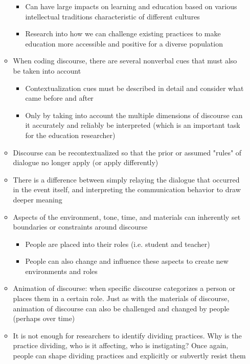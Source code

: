 \documentclass{TC}
\begin{document}
\begin{itemize}
\begin{itemize}
\begin{itemize}
	\item Can have large impacts on learning and education based on various intellectual traditions characteristic of different cultures
	\item Research into how we can challenge existing practices to make education more accessible and positive for a diverse population
	\end{itemize}
\item When coding discourse, there are several nonverbal cues that must also be taken into account
	\begin{itemize}
	\item Contextualization cues must be described in detail and consider what came before and after
	\item Only by taking into account the multiple dimensions of discourse can it accurately and reliably be interpreted (which is an important task for the education researcher)
	\end{itemize}
\item Discourse can be recontextualized so that the prior or assumed "rules" of dialogue no longer apply (or apply differently)
\item There is a difference between simply relaying the dialogue that occurred in the event itself, and interpreting the communication behavior to draw deeper meaning
\item Aspects of the environment, tone, time, and materials can inherently set boundaries or constraints around discourse
	\begin{itemize}
	\item People are placed into their roles (i.e. student and teacher)
	\item People can also change and influence these aspects to create new environments and roles
	\end{itemize}
\item Animation of discourse: when specific discourse categorizes a person or places them in a certain role. Just as with the materials of discourse, animation of discourse can also be challenged and changed by people (perhaps over time)
\item It is not enough for researchers to identify dividing practices. Why is the practice dividing, who is it affecting, who is instigating? Once again, people can shape dividing practices and explicitly or subvertly resist them
\end{itemize}


\end{itemize}
\end{document}

